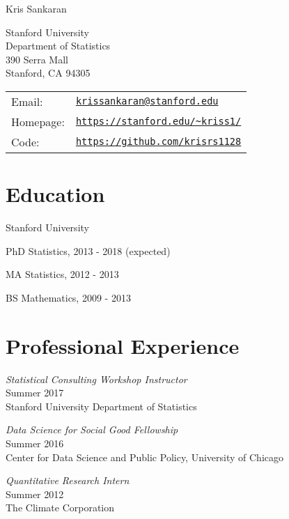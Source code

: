 \documentclass[letterpaper]{article}
\def\name{Kris Sankaran}
\renewenvironment{itemize}{
  \begin{list}{}{
    \setlength{\leftmargin}{1.5em}
  }
}{
  \end{list}
}
\begin{document}
{\huge \name}


\vspace{0.25in}

\begin{minipage}{0.45\linewidth}
  Stanford University \\
  Department of Statistics \\
  390 Serra Mall \\
  Stanford, CA 94305
\end{minipage}
\begin{minipage}{0.45\linewidth}
  \begin{tabular}{ll}
    Email: & \href{mailto:krissankaran@stanford.edu}{\tt krissankaran@stanford.edu} \\
    Homepage: & \href{http://stanford.edu/\textasciitilde kriss1}{\tt https://stanford.edu/\textasciitilde kriss1/} \\
    Code: & \href{https://github.com/krisrs1128}{\tt https://github.com/krisrs1128}
  \end{tabular}
\end{minipage}

\section*{Education}
Stanford University
\begin{itemize}
  \item PhD Statistics, 2013 - 2018 (expected)
  \item MA Statistics, 2012 - 2013
  \item BS Mathematics, 2009 - 2013
\end{itemize}

\section*{Professional Experience}
\begin{itemize}
\item \textit{Statistical Consulting Workshop Instructor} \\
  Summer 2017 \\
  Stanford University Department of Statistics
\item \textit{Data Science for Social Good Fellowship} \\
  Summer 2016 \\
  Center for Data Science and Public Policy, University of Chicago
\item \textit{Quantitative Research Intern} \\
  Summer 2012 \\
  The Climate Corporation
\end{itemize}
\end{document}
